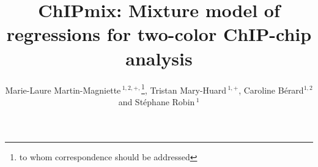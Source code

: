 \documentclass{bioinfo}
\begin{document}

\title[ChIPmix]{ChIPmix: Mixture model of regressions for two-color ChIP-chip analysis}
\author[Sample \textit{et~al}]{Marie-Laure Martin-Magniette\,$^{1,2,+,}$\footnote{to whom correspondence should be addressed},
Tristan Mary-Huard\,$^{1,+}$,  Caroline B\'erard$^{1,2}$
and St\'ephane Robin\,$^1$}


\address{$^{1}$UMR AgroParisTech/INRA MIA 518, 16 rue Claude Bernard,
  75231 Paris Cedex 05, France.\\
  $^{2}$URGV UMR INRA/CNRS/UEVE, 2 rue Gaston Cr\'emieux, CP5708,
  91057, Evry Cedex, France.\\
  $^+$ Both authors contributed equally to this work.}



\maketitle
\end{document}
